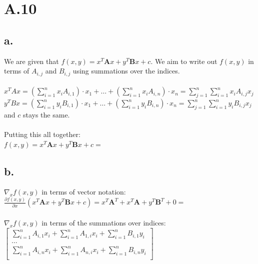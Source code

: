 \documentclass{article}
\newcommand{\1}{\mathbf{1}}
\newcommand{\mat}[1]{\boldsymbol{#1}} %
\begin{document}
\section*{A.10}
{\Large  

\subsection*{a.}
We are given that $f(x, y) = x^T \mat{A} x + y^T \mat{B} x + c$. We aim to write out $f(x, y)$ in terms of $A_{i,j}$ and $B_{i,j}$ using summations over the indices. \\ \\
$x^T A x = (\sum_{i=1}^{n} x_iA_{i, 1}) \cdot x_1 + \dots + (\sum_{i=1}^{n} x_iA_{i, n}) \cdot x_n = \sum_{j=1}^{n} \sum_{i=1}^{n} x_i A_{i,j} x_j$  \\ 
$y^T B x = (\sum_{i=1}^{n} y_iB_{i, 1}) \cdot x_1 + \dots + (\sum_{i=1}^{n} y_iB_{i, n}) \cdot x_n = \sum_{j=1}^{n} \sum_{i=1}^{n} y_i B_{i,j} x_j$ \\
and $c$ stays the same. \\ \\
Putting this all together: \\
$f(x, y) = x^T \mat{A} x + y^T \mat{B} x + c =$ 

\subsection*{b.}
$\nabla_x f(x,y)$ in terms of vector notation: \\
$\frac{\partial f(x,y)}{\partial x}(x^T \mat{A} x + y^T \mat{B} x + c) = x^T\mat{A}^T + x^T\mat{A} + y^T\mat{B}^T + 0 = $ \framebox[1.1\width]{\textbf{$\mat{A}^Tx + \mat{A}x + \mat{B}^Ty$}} \\ \\ 
$\nabla_x f(x,y)$ in terms of the summations over indices: \\ 
$\begin{bmatrix}
\sum_{i=1}^{n} A_{i,1} x_i + \sum_{i=1}^{n} A_{1, i} x_i + \sum_{i=1}^{n} B_{i,1} y_i \\
\dots \\
\sum_{i=1}^{n} A_{i,n} x_i + \sum_{i=1}^{n} A_{n, i} x_i + \sum_{i=1}^{n} B_{i,n} y_i \\
\end{bmatrix}$

}
\end{document}

